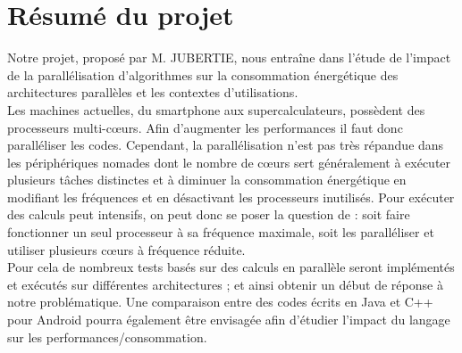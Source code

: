 \chapter{Résumé du projet}

Notre projet, proposé par M. JUBERTIE, nous entraîne dans l'étude de l'impact de la parallélisation d'algorithmes sur la consommation énergétique des architectures parallèles et les contextes d'utilisations.\\ 

Les machines actuelles, du smartphone aux supercalculateurs, possèdent des 
processeurs multi-c\oe{}urs. Afin d'augmenter les performances il faut donc 
paralléliser les codes. Cependant, la parallélisation n'est pas très répandue dans les périphériques nomades dont le nombre de c\oe{}urs sert généralement à exécuter plusieurs tâches distinctes et à diminuer la consommation 
énergétique en modifiant les fréquences et en désactivant les processeurs 
inutilisés. Pour exécuter des calculs peut intensifs, on peut donc se poser la question de : soit faire fonctionner un seul processeur à sa fréquence 
maximale, soit les paralléliser et utiliser plusieurs c\oe{}urs à fréquence réduite. \\

Pour cela de nombreux tests basés sur des calculs en parallèle seront implémentés et exécutés sur différentes architectures ; et ainsi obtenir un début de réponse à notre problématique.
Une comparaison entre des codes écrits en Java et C++ pour Android pourra 
également être envisagée afin d'étudier l'impact du langage sur les 
performances/consommation. \\ 
